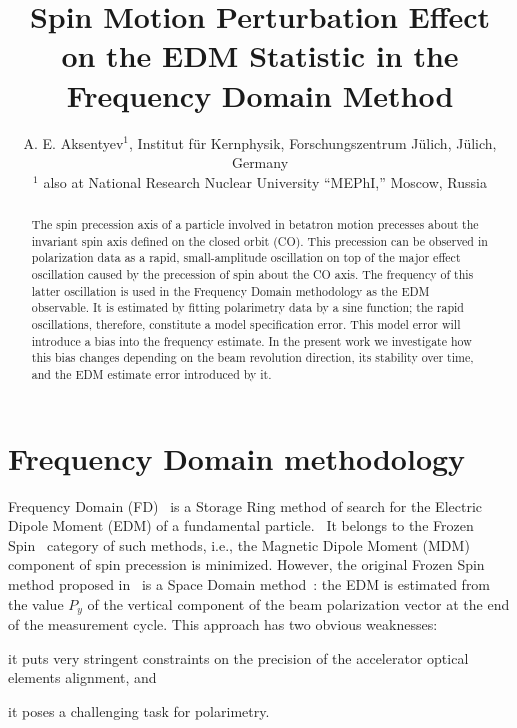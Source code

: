 \documentclass[a4paper]{jacow}
\begin{document}
\title{Spin Motion Perturbation Effect on the EDM Statistic in the Frequency Domain Method}
\author{A. E. Aksentyev$^1$\footnotemark[2], Institut f\"ur Kernphysik, Forschungszentrum J\"ulich, J\"ulich, Germany \\$^1$ also at National Research Nuclear University ``MEPhI,'' Moscow, Russia}
\maketitle
{}
\begin{abstract}
  The spin precession axis of a particle involved in betatron motion precesses about the invariant spin axis
  defined on the closed orbit (CO). This precession can be observed in polarization data as a rapid,
  small-amplitude oscillation on top of the major effect oscillation caused by the precession of spin
  about the CO axis. The frequency of this latter oscillation is used in the Frequency Domain methodology
  as the EDM observable. It is estimated by fitting polarimetry data by a sine function; the rapid
  oscillations, therefore, constitute a model specification error.
  This model error will introduce a bias into the frequency estimate. In the present work we investigate
  how this bias changes depending on the beam revolution direction, its stability over time, and
  the EDM estimate error introduced by it.
\end{abstract}

\section{Frequency Domain methodology}
Frequency Domain (FD)~\cite{Senichev:FDM} is a Storage Ring method of search for the
Electric Dipole Moment (EDM) of a fundamental particle.~\cite{BNL:SREDM}
It belongs to the Frozen Spin~\cite{BNL:Deuteron2008} category
of such methods, i.e., the Magnetic Dipole Moment (MDM) component of spin precession is minimized. However,
the original Frozen Spin method proposed in~\cite{BNL:Deuteron2008} is a Space Domain
method~\cite[p.~4]{Talman:ElectricRings}: the EDM is estimated from the value $P_y$ of
the vertical component of the beam polarization vector at the end of the measurement cycle. This approach has
two obvious weaknesses:
\begin{inparaenum}
\item it puts very stringent constraints on the precision of the accelerator optical elements alignment, and
\item it poses a challenging task for polarimetry.~\cite[p.~6]{Mane:SpinWheel}
\end{inparaenum}
\end{document}
